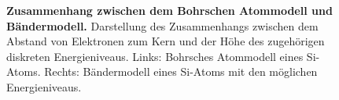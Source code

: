 {\begin{figure}[H]
\begin{minipage}[c]{0.48\textwidth}
\begin{figure}[H]
            \end{figure}
        \end{minipage}
        \caption{\textbf{Zusammenhang zwischen dem Bohrschen Atommodell und Bändermodell.} Darstellung des Zusammenhangs 
                zwischen dem Abstand von Elektronen zum Kern und der Höhe des zugehörigen diskreten Energieniveaus. Links: Bohrsches 
                Atommodell eines Si-Atoms. Rechts: Bändermodell eines Si-Atoms mit den möglichen Energieniveaus.}  
        \label{fig:ZusammenhangBohrschesAtommodellUndBaendermodell}
    \end{figure}
}



